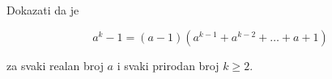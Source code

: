\documentclass[11pt]{article}
\begin{document}
	\noindent
	Dokazati da je
	
	\begin{equation*}
		a^k - 1 = (a - 1)(a^{k - 1} + a^{k - 2} + \ldots + a + 1)
	\end{equation*}

	\noindent
	za svaki realan broj $ a $ i svaki prirodan broj $ k \geq 2 $.
\end{document}
